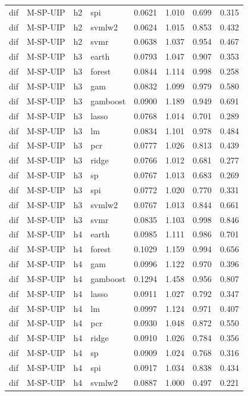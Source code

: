 \begin{ThreePartTable}
\begin{longtable}[t]{llclcccc}
dif & M-SP-UIP & h2 & spi & 0.0621 & 1.010 & 0.699 & 0.315\\
dif & M-SP-UIP & h2 & svmlw2 & 0.0624 & 1.015 & 0.853 & 0.432\\
dif & M-SP-UIP & h2 & svmr & 0.0638 & 1.037 & 0.954 & 0.467\\
\addlinespace
dif & M-SP-UIP & h3 & earth & 0.0793 & 1.047 & 0.907 & 0.353\\
dif & M-SP-UIP & h3 & forest & 0.0844 & 1.114 & 0.998 & 0.258\\
dif & M-SP-UIP & h3 & gam & 0.0832 & 1.099 & 0.979 & 0.580\\
dif & M-SP-UIP & h3 & gamboost & 0.0900 & 1.189 & 0.949 & 0.691\\
dif & M-SP-UIP & h3 & lasso & 0.0768 & 1.014 & 0.701 & 0.289\\
dif & M-SP-UIP & h3 & lm & 0.0834 & 1.101 & 0.978 & 0.484\\
dif & M-SP-UIP & h3 & pcr & 0.0777 & 1.026 & 0.813 & 0.439\\
dif & M-SP-UIP & h3 & ridge & 0.0766 & 1.012 & 0.681 & 0.277\\
dif & M-SP-UIP & h3 & sp & 0.0767 & 1.013 & 0.683 & 0.269\\
dif & M-SP-UIP & h3 & spi & 0.0772 & 1.020 & 0.770 & 0.331\\
dif & M-SP-UIP & h3 & svmlw2 & 0.0767 & 1.013 & 0.844 & 0.661\\
dif & M-SP-UIP & h3 & svmr & 0.0835 & 1.103 & 0.998 & 0.846\\
\addlinespace
dif & M-SP-UIP & h4 & earth & 0.0985 & 1.111 & 0.986 & 0.701\\
dif & M-SP-UIP & h4 & forest & 0.1029 & 1.159 & 0.994 & 0.656\\
dif & M-SP-UIP & h4 & gam & 0.0996 & 1.122 & 0.970 & 0.396\\
dif & M-SP-UIP & h4 & gamboost & 0.1294 & 1.458 & 0.956 & 0.807\\
dif & M-SP-UIP & h4 & lasso & 0.0911 & 1.027 & 0.792 & 0.347\\
dif & M-SP-UIP & h4 & lm & 0.0997 & 1.124 & 0.971 & 0.407\\
dif & M-SP-UIP & h4 & pcr & 0.0930 & 1.048 & 0.872 & 0.550\\
dif & M-SP-UIP & h4 & ridge & 0.0910 & 1.026 & 0.784 & 0.356\\
dif & M-SP-UIP & h4 & sp & 0.0909 & 1.024 & 0.768 & 0.316\\
dif & M-SP-UIP & h4 & spi & 0.0917 & 1.034 & 0.838 & 0.434\\
dif & M-SP-UIP & h4 & svmlw2 & 0.0887 & 1.000 & 0.497 & 0.221\\

\end{longtable}
\end{ThreePartTable}
